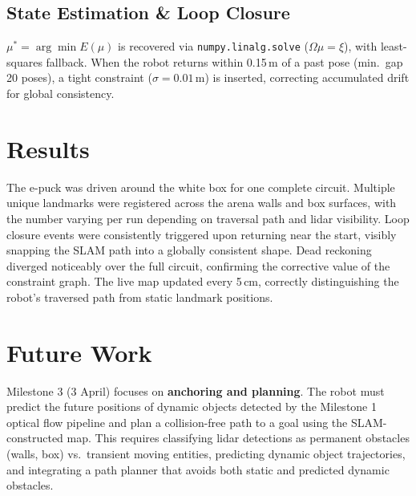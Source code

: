 \documentclass[8pt,a4paper,twocolumn]{article}
\begin{document}
\subsection{State Estimation \& Loop Closure}
$\mu^*=\arg\min E(\mu)$ is recovered via \texttt{numpy.linalg.solve} ($\Omega\mu=\xi$), with least-squares fallback. When the robot returns within 0.15\,m of a past pose (min.\ gap 20 poses), a tight constraint ($\sigma=0.01$\,m) is inserted, correcting accumulated drift for global consistency.

\section{Results}

The e-puck was driven around the white box for one complete circuit. Multiple unique landmarks were registered across the arena walls and box surfaces, with the number varying per run depending on traversal path and lidar visibility. Loop closure events were consistently triggered upon returning near the start, visibly snapping the SLAM path into a globally consistent shape. Dead reckoning diverged noticeably over the full circuit, confirming the corrective value of the constraint graph. The live map updated every 5\,cm, correctly distinguishing the robot's traversed path from static landmark positions.

\section{Future Work}

Milestone 3 (3 April) focuses on \textbf{anchoring and planning}. The robot must predict the future positions of dynamic objects detected by the Milestone 1 optical flow pipeline and plan a collision-free path to a goal using the SLAM-constructed map. This requires classifying lidar detections as permanent obstacles (walls, box) vs.\ transient moving entities, predicting dynamic object trajectories, and integrating a path planner that avoids both static and predicted dynamic obstacles.
\end{document}
